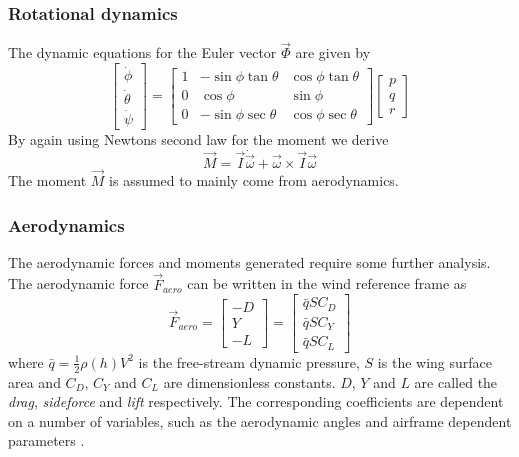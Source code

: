 \subsubsection{Rotational dynamics}
The dynamic equations for the Euler vector $\vec{\Phi}$ are given by
\begin{equation}
    \begin{bmatrix}
        \dot{\phi} \\
        \dot{\theta} \\
        \dot{\psi}
    \end{bmatrix}
    =
    \begin{bmatrix}
        1 & -\sin\phi\tan\theta & \cos\phi\tan\theta \\
        0 & \cos\phi & \sin\phi \\
        0 & -\sin\phi\sec\theta & \cos\phi\sec\theta
    \end{bmatrix}
    \begin{bmatrix}
        p \\
        q \\
        r
    \end{bmatrix}
\end{equation}
By again using Newtons second law for the moment we derive
\begin{equation}
    \vec{M}=\vec{I}\dot{\vec{\omega}} + \vec{\omega}\times\vec{I}\vec{\omega}
\end{equation}
The moment $\vec{M}$ is assumed to mainly come from aerodynamics.
\subsubsection{Aerodynamics}
The aerodynamic forces and moments generated require some further analysis. The aerodynamic
force $\vec{F}_{aero}$ can be written in the wind reference frame as
\begin{equation}
    \vec{F}_{aero}=
    \begin{bmatrix}
        -D \\
        Y \\
        -L
    \end{bmatrix}=
    \begin{bmatrix}
        \bar{q}SC_D \\
        \bar{q}SC_Y \\
        \bar{q}SC_L
    \end{bmatrix}
\end{equation}
where $\bar{q}=\frac{1}{2}\rho(h)V^2$ is the free-stream dynamic pressure, $S$ is the 
wing surface area and $C_D$, $C_Y$ and $C_L$ are dimensionless constants.
$D$, $Y$ and $L$ are called the \textit{drag}, \textit{sideforce} and \textit{lift} respectively. 
The corresponding coefficients are dependent on a number of variables, such as the aerodynamic angles
and airframe dependent parameters \cite{fighter_aircraft_mpc}.\\

